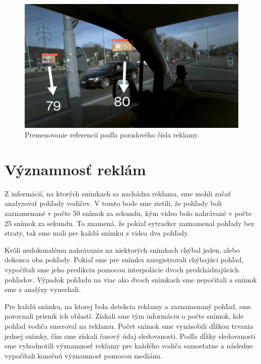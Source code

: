 \begin{figure}[ht]
     \centering
     \includegraphics[width=1\textwidth]{images/04/mapping.jpg}
     \caption{Premenovanie referencií podľa poradového čísla reklamy.}
     \label{img:mapping}
 \end{figure}

\section{Významnosť reklám}

Z informácií, na ktorých snímkach sa nachádza reklama, sme mohli začať analyzovať pohľady vodičov. V tomto bode sme zistili, že pohľady boli zaznamenané v počte 50 snímok za sekundu, kým video bolo nahrávané v počte 25 snímok za sekundu. To znamená, že pokiaľ eytracker zaznamenal pohľady bez straty, tak sme mali pre každú snímku z videa dva pohľady.

Kvôli nedokonalému nahrávaniu na niektorých snímkach chýbal jeden, alebo dokonca oba pohľady. Pokiaľ sme pre snímku zaregistrovali chýbajúci pohľad, vypočítali sme jeho predikciu pomocou interpolácie dvoch predchádzajúcich pohľadov. Výpadok pohľadu na viac ako dvoch snímkach sme nepočítali a snímok sme z analýzy vynechali.

Pre každú snímku, na ktorej bola detekcia reklamy a zaznamenaný pohľad, sme porovnali prienik ich oblastí. Získali sme tým informáciu o počte snímok, kde pohľad vodiča smeroval na reklamu. Počet snímok sme vynásobili dĺžkou trvania jednej snímky, čím sme získali časový údaj sledovanosti. Podľa dĺžky sledovanosti sme vyhodnotili významnosť reklamy pre každého vodiča samostatne a následne vypočítali konečnú významnosť pomocou mediánu.


